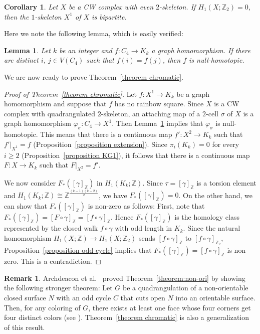 \documentclass[11pt, amsfonts]{amsart}
\numberwithin{equation}{section}
\newtheorem{lemma}[thm]{Lemma}
\newtheorem{corollary}[thm]{Corollary}
\theoremstyle{definition}
\newtheorem{remark}[thm]{Remark}
\theoremstyle{remark}
\newcommand{\ZZ}{\mathbb{Z}}
\begin{document}
\begin{corollary} \label{corollary bipartite}
Let $X$ be a CW complex with even $2$-skeleton. If $H_1(X; \ZZ_2) = 0$, then the $1$-skeleton $X^1$ of $X$ is bipartite.
\end{corollary}

Here we note the following lemma, which is easily verified:

\begin{lemma} \label{lemma null square}
Let $k$ be an integer and $f \colon C_4 \to K_k$ a graph homomorphism. If there are distinct $i$, $j \in V(C_4)$ such that $f(i) = f(j)$, then $f$ is null-homotopic.
\end{lemma}

We are now ready to prove Theorem~\ref{theorem chromatic}.

\begin{proof}[Proof of Theorem~\ref{theorem chromatic}]
Let  $f \colon X^1 \to K_k$ be a graph homomorphism and suppose that $f$ has no rainbow square. Since $X$ is a CW complex with quadrangulated $2$-skeleton, an attaching map of a $2$-cell $\sigma$ of $X$ is a graph homomorphism $\varphi_\sigma \colon C_4 \to X^1$. Then Lemma~\ref{lemma null square} implies that $\varphi_\sigma$ is null-homotopic. This means that there is a continuous map $f' \colon X^2 \to K_k$ such that $f'|_{X^1} = f$ (Proposition~\ref{proposition extension}). Since $\pi_i(K_k) = 0$ for every $i \ge 2$ (Proposition~\ref{proposition KG1}), it follows that there is a continuous map $F \colon X \to K_k$ such that $F|_{X^2} = f'$.

We now consider $F_*([\gamma]_{\ZZ})$ in $H_1(K_k ; \ZZ)$. Since $\tau = [\gamma]_{\ZZ}$ is a torsion element and $H_1(K_k; \ZZ) \cong \ZZ^{\frac{(k-1)(k-2)}{2}}$, we have $F_*([\gamma]_{\ZZ}) = 0$. On the other hand, we can show that $F_*([\gamma]_{\ZZ})$ is non-zero as follows: First, note that $F_*([\gamma]_{\ZZ}) = [F \circ \gamma]_{\ZZ} = [f \circ \gamma]_{\ZZ}$. Hence $F_*([\gamma]_{\ZZ})$ is the homology class represented by the closed walk $f \circ \gamma$ with odd length in $K_k$. Since the natural homomorphism $H_1(X; \ZZ) \to H_1(X; \ZZ_2)$ sends $[f \circ \gamma]_{\ZZ}$ to $[f \circ \gamma]_{\ZZ_2}$, Proposition~\ref{proposition odd cycle} implies that $F_*([\gamma]_\ZZ) = [f \circ \gamma]_{\ZZ}$ is non-zero. This is a contradiction.
\end{proof}

\begin{remark} \label{remark archdeaconetal}
Archdeacon et al.~\cite{AHNNO} proved Theorem~\ref{theorem:non-ori} by showing the following stronger theorem: Let $G$ be a quadrangulation of a non-orientable closed surface $N$ with an odd cycle $C$ that cuts open $N$ into an orientable surface.
Then, for any coloring of $G$, there exists at least one face whose four corners get four distinct colors (see \cite[Theorem 9]{AHNNO}). Theorem~\ref{theorem chromatic} is also a generalization of this result.
\end{remark}
\end{document}
